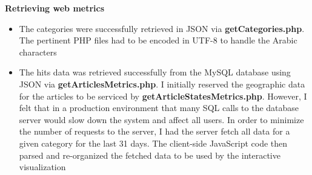 \documentclass[12pt]{article}
\begin{document}
{\noindent\textbf{Retrieving web metrics}
\begin{itemize}
\item The categories were successfully retrieved in JSON via \textbf{getCategories.php}. The pertinent PHP files had to be encoded in UTF-8 to handle the Arabic characters
\item The hits data was retrieved successfully from the MySQL database using JSON via \textbf{getArticlesMetrics.php}. I initially reserved the geographic data for the articles to be serviced by \textbf{getArticleStatesMetrics.php}. However, I felt that in a production environment that many SQL calls to the database server would slow down the system and affect all users. In order to minimize the number of requests to the server, I had the server fetch all data for a given category for the last 31 days. The client-side JavaScript code then parsed and re-organized the fetched data to be used by the interactive visualization
\end{itemize}

\vspace{0.2in}

}
\end{document}
